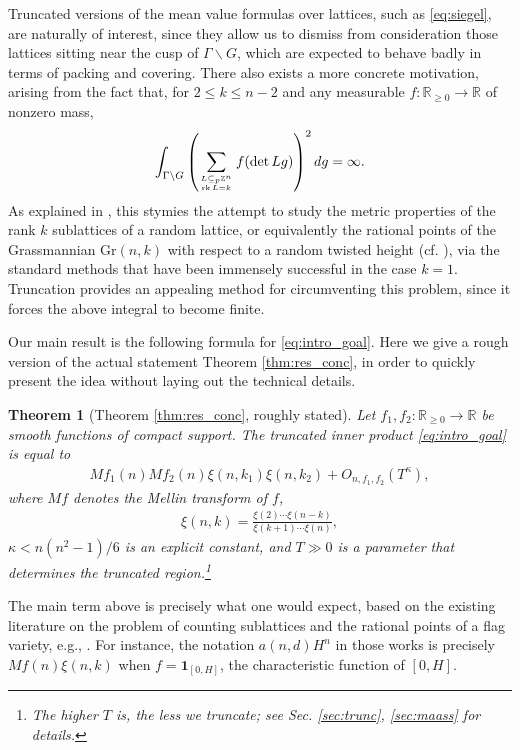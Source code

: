\documentclass[11pt]{amsart}
\def\R{\mathbb{R}}
\newtheorem{theorem}{Theorem}
\numberwithin{theorem}{section}
\numberwithin{equation}{section}
\theoremstyle{remark}
\theoremstyle{definition}
\newcommand{\Z}{\mathbb{Z}}
\newcommand{\rk}{\mathrm{rk\,}}
\begin{document}
Truncated versions of the mean value formulas over lattices, such as \eqref{eq:siegel}, are naturally of interest, since they allow us to dismiss from consideration those lattices sitting near the cusp of $\Gamma\backslash G$, which are expected to behave badly in terms of packing and covering. There also exists a more concrete motivation, arising from the fact \cite[Corollary to Theorem 4]{Kim22} that, for $2 \leq k \leq n-2$ and any measurable $f:\R_{\geq 0}\rightarrow\R$ of nonzero mass,
\begin{align*}
\int_{\Gamma\backslash G} \left(\sum_{L \subseteq_p \Z^n \atop \rk L=k} f(\det Lg)\right)^2dg = \infty.
\end{align*}
As explained in \cite{Kim22}, this stymies the attempt to study the metric properties of the rank $k$ sublattices of a random lattice, or equivalently the rational points of the Grassmannian $\mathrm{Gr}(n,k)$ with respect to a random twisted height (cf. \cite{Thu93}), via the standard methods that have been immensely successful in the case $k=1$. Truncation provides an appealing method for circumventing this problem, since it forces the above integral to become finite.

Our main result is the following formula for \eqref{eq:intro_goal}. Here we give a rough version of the actual statement Theorem \ref{thm:res_conc}, in order to quickly present the idea without laying out the technical details.
\begin{theorem}[Theorem \ref{thm:res_conc}, roughly stated] \label{thm:intro_main}
Let $f_1,f_2:\R_{\geq 0} \rightarrow \R$ be smooth functions of compact support.
The truncated inner product \eqref{eq:intro_goal} is equal to
\begin{align*}
Mf_1(n)Mf_2(n)\xi(n,k_1)\xi(n,k_2) + O_{n,f_1,f_2}(T^\kappa),
\end{align*}
where $Mf$ denotes the Mellin transform of $f$,
\begin{align*}
\xi(n,k)=\frac{\xi(2)\cdots\xi(n-k)}{\xi(k+1)\cdots\xi(n)},
\end{align*}
$\kappa < n(n^2-1)/6$ is an explicit constant, and $T\gg 0$ is a parameter that determines the truncated region.\footnote{The higher $T$ is, the less we truncate; see Sec. \ref{sec:trunc}, \ref{sec:maass} for details.}
\end{theorem}
The main term above is precisely what one would expect, based on the existing literature on the problem of counting sublattices and the rational points of a flag variety, e.g., \cite{Sch68, Thu93, Kim22, Kim23}. For instance, the notation $a(n,d)H^n$ in those works is precisely $Mf(n)\xi(n,k)$ when $f=\mathbf 1_{[0,H]}$, the characteristic function of $[0,H]$.
\end{document}

